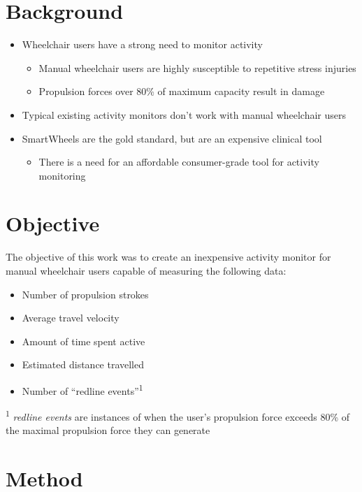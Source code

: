 \documentclass[a0,landscape]{a0poster}
\begin{document}
\begin{multicols*}{3}
\section*{Background}
\begin{itemize}
    \item Wheelchair users have a strong need to monitor activity
        \begin{itemize}
            \item Manual wheelchair users are highly susceptible to repetitive stress injuries \cite{big}
            \item Propulsion forces over 80\% of maximum capacity result in damage \cite{small}
        \end{itemize}
    \item Typical existing activity monitors don't work with manual wheelchair users
    \item SmartWheels are the gold standard, but are an expensive clinical tool
        \begin{itemize}
            \item There is a need for an affordable consumer-grade tool for activity monitoring
        \end{itemize}
\end{itemize}

\section*{Objective}
The objective of this work was to create an inexpensive activity monitor for manual wheelchair users capable of measuring the following data:

\begin{itemize}
    \item Number of propulsion strokes
    \item Average travel velocity
    \item Amount of time spent active
    \item Estimated distance travelled
    \item Number of ``redline events''\textsuperscript{1}
\end{itemize}

\textsuperscript{1} \textit{redline events} are instances of when the user's propulsion force exceeds 80\% of the maximal propulsion force they can generate

\section*{Method}


\end{multicols*}
\end{document}

